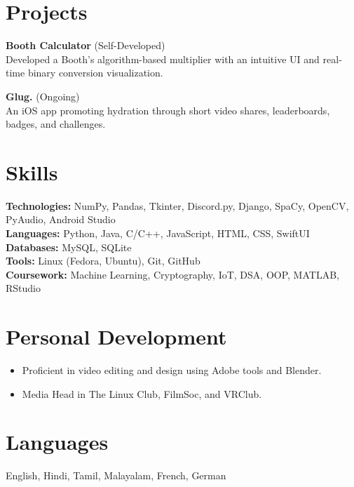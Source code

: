 \documentclass[10pt, letterpaper]{article}
\begin{document}
\section{Projects}
\textbf{Booth Calculator} (Self-Developed)\\
Developed a Booth’s algorithm-based multiplier with an intuitive UI and real-time binary conversion visualization.

\textbf{Glug.} (Ongoing)\\
An iOS app promoting hydration through short video shares, leaderboards, badges, and challenges.

\section{Skills}
\textbf{Technologies:} NumPy, Pandas, Tkinter, Discord.py, Django, SpaCy, OpenCV, PyAudio, Android Studio\\
\textbf{Languages:} Python, Java, C/C++, JavaScript, HTML, CSS, SwiftUI\\
\textbf{Databases:} MySQL, SQLite\\
\textbf{Tools:} Linux (Fedora, Ubuntu), Git, GitHub\\
\textbf{Coursework:} Machine Learning, Cryptography, IoT, DSA, OOP, MATLAB, RStudio

\section{Personal Development}
\begin{itemize}
    \item Proficient in video editing and design using Adobe tools and Blender.
    \item Media Head in The Linux Club, FilmSoc, and VRClub.
\end{itemize}

\section{Languages}
English, Hindi, Tamil, Malayalam, French, German
\end{document}
